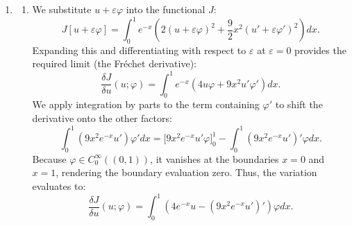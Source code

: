 \documentclass[10pt,a4paper]{article}
\begin{document}
\begin{enumerate}[label=\fbox{\arabic*}]
\begin{enumerate}[label=(\roman*)]
          \item We rewrite the PDE as $u_\varepsilon - f = \varepsilon \Delta u_\varepsilon$. Our goal is to show $\|u_\varepsilon - f\|_{L^2} \to 0$.
          We utilize a density argument. Let $\delta > 0$ be given. Since $C_c^\infty(\Omega)$ is dense in $L^2(\Omega)$, there exists a function $g \in C_c^\infty(\Omega)$ such that $\|f - g\|_{L^2} < \delta$. Let $h = f - g$, so $f = g + h$.
          By linearity of the PDE, the solution $u_\varepsilon(f)$ corresponding to $f$ can be decomposed as $u_\varepsilon(g) + u_\varepsilon(h)$. By the triangle inequality:
          \[
            \|u_\varepsilon(f) - f\|_{L^2} \le \|u_\varepsilon(g) - g\|_{L^2} + \|u_\varepsilon(h) - h\|_{L^2}.
          \]
          For the $h$ term, from part (i) we know $\|u_\varepsilon(h)\|_{L^2} \le \|h\|_{L^2}$. Thus:
          \[
            \|u_\varepsilon(h) - h\|_{L^2} \le \|u_\varepsilon(h)\|_{L^2} + \|h\|_{L^2} \le 2\|h\|_{L^2} < 2\delta.
          \]
          For the smooth, compactly supported $g$, let $w = u_\varepsilon(g) - g$. Substituting into the PDE gives $-\varepsilon \Delta w + w = \varepsilon \Delta g$. Since $g$ vanishes on $\partial\Omega$, $w \in H_0^1(\Omega)$. Multiplying by $w$ and integrating yields:
          \[
            \varepsilon \|\nabla w\|_{L^2}^2 + \|w\|_{L^2}^2 = \varepsilon \int_\Omega (\Delta g) w dx \le \varepsilon \|\Delta g\|_{L^2} \|w\|_{L^2}.
          \]
          This implies $\|w\|_{L^2} \le \varepsilon \|\Delta g\|_{L^2}$. As $\varepsilon \downarrow 0$, $\|u_\varepsilon(g) - g\|_{L^2} \to 0$.
          Taking the limit superior of the whole expression gives $\limsup_{\varepsilon \downarrow 0} \|u_\varepsilon(f) - f\|_{L^2} \le 2\delta$. Since $\delta > 0$ is arbitrary, the limit is strictly $0$.
        \end{enumerate}

  \item %
        \begin{enumerate}[label=(\arabic*)]
          \item We substitute $u + \varepsilon\varphi$ into the functional $J$:
          \[
            J[u + \varepsilon\varphi] = \int_0^1 e^{-x} \left( 2(u + \varepsilon\varphi)^2 + \frac{9}{2}x^2 (u' + \varepsilon\varphi')^2 \right) dx.
          \]
          Expanding this and differentiating with respect to $\varepsilon$ at $\varepsilon = 0$ provides the required limit (the Fréchet derivative):
          \[
            \frac{\delta J}{\delta u}(u; \varphi) = \int_0^1 e^{-x} \left( 4u\varphi + 9x^2 u' \varphi' \right) dx.
          \]
          We apply integration by parts to the term containing $\varphi'$ to shift the derivative onto the other factors:
          \[
            \int_0^1 (9x^2 e^{-x} u') \varphi' dx = \Big[ 9x^2 e^{-x} u' \varphi \Big]_0^1 - \int_0^1 (9x^2 e^{-x} u')' \varphi dx.
          \]
          Because $\varphi \in C_0^\infty((0, 1))$, it vanishes at the boundaries $x=0$ and $x=1$, rendering the boundary evaluation zero. Thus, the variation evaluates to:
          \[
            \frac{\delta J}{\delta u}(u; \varphi) = \int_0^1 \left( 4e^{-x}u - (9x^2 e^{-x} u')' \right) \varphi dx.
          \]


\end{enumerate}
\end{enumerate}
\end{document}
